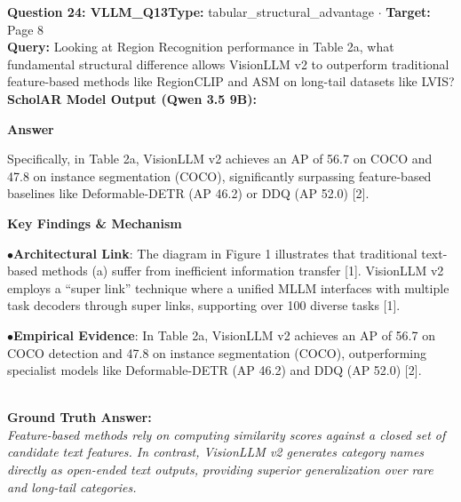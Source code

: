 \documentclass[10pt,a4paper]{article}
\begin{document}
\begin{tcolorbox}[questionbox]
{\noindent\bfseries\large\color{navy} Question 24: VLLM\_Q13}\hfill {\footnotesize\color{darkteal}\textbf{Type:} tabular\_structural\_advantage $\cdot$ \textbf{Target:} Page 8}\\[4pt]
{\noindent\bfseries\color{accentblue} Query: } Looking at Region Recognition performance in Table 2a, what fundamental structural difference allows VisionLLM v2 to outperform traditional feature-based methods like RegionCLIP and ASM on long-tail datasets like LVIS?\\[6pt]
{\noindent\bfseries\color{navy} ScholAR Model Output (Qwen 3.5 9B):}\\[2pt]
{\small \noindent \textbf{Answer}\par\vspace{3pt}Specifically, in Table 2a, VisionLLM v2 achieves an AP of 56.7 on COCO and 47.8 on instance segmentation (COCO), significantly surpassing feature-based baselines like Deformable-DETR (AP 46.2) or DDQ (AP 52.0) [2].\par\vspace{3pt}\noindent \textbf{Key Findings \& Mechanism}\par\vspace{3pt}\noindent\hspace*{8pt}$\bullet$\hspace*{4pt}\textbf{Architectural Link}: The diagram in Figure 1 illustrates that traditional text-based methods (a) suffer from inefficient information transfer [1]. VisionLLM v2 employs a ``super link'' technique where a unified MLLM interfaces with multiple task decoders through super links, supporting over 100 diverse tasks [1].\par\vspace{3pt}\noindent\hspace*{8pt}$\bullet$\hspace*{4pt}\textbf{Empirical Evidence}: In Table 2a, VisionLLM v2 achieves an AP of 56.7 on COCO detection and 47.8 on instance segmentation (COCO), outperforming specialist models like Deformable-DETR (AP 46.2) and DDQ (AP 52.0) [2].}\\[6pt]
{\noindent\bfseries\color{darkteal} Ground Truth Answer:}\\[2pt]
{\small\itshape Feature-based methods rely on computing similarity scores against a closed set of candidate text features. In contrast, VisionLLM v2 generates category names directly as open-ended text outputs, providing superior generalization over rare and long-tail categories.}\\[4pt]

\end{tcolorbox}
\end{document}
